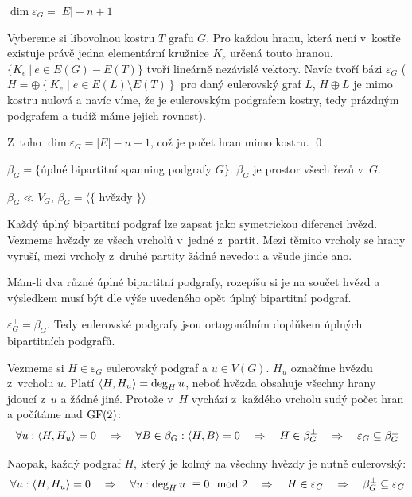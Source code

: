 \lm $\dim \varepsilon_G = |E| - n + 1$

\dk Vybereme si libovolnou kostru $T$ grafu $G$. Pro každou hranu, která není v~kostře
existuje právě jedna elementární kružnice $K_e$ určená touto hranou. $\{ K_e\ |\ e \in
E(G) - E(T) \}$ tvoří lineárně nezávislé vektory. Navíc tvoří bázi $\varepsilon_G$ ($H
= \oplus \left\{ K_e \mid e \in E(L) \setminus E(T) \right\}$ pro daný eulerovský graf
$L$, $H \oplus L$ je mimo kostru nulová a navíc víme, že je eulerovským podgrafem
kostry, tedy prázdným podgrafem a tudíž máme jejich rovnost).

Z~toho $\dim \varepsilon_G = |E| - n + 1$, což je počet hran mimo kostru. \qed

\df $\beta_G = \{$úplné bipartitní spanning podgrafy $G\}$. $\beta_G$ je
prostor všech řezů v~$G$.

\lm $\beta_G \ll V_G$, $\beta_G = \langle\{$ hvězdy $\}\rangle$

\dk Každý úplný bipartitní podgraf lze zapsat jako symetrickou diferenci hvězd.
Vezmeme hvězdy ze všech vrcholů v~jedné z~partit. Mezi těmito vrcholy se hrany
vyruší, mezi vrcholy z~druhé partity žádné nevedou a všude jinde ano. 

Mám-li dva různé úplné bipartitní podgrafy, rozepíšu si je na součet hvězd a
výsledkem musí být dle výše uvedeného opět úplný bipartitní podgraf.

\vt $\varepsilon_G^\bot = \beta_G$. Tedy eulerovské podgrafy jsou ortogonálním
doplňkem úplných bipartitních podgrafů.

\dk Vezmeme si $H \in \varepsilon_G$ eulerovský podgraf a $u \in V(G)$. $H_u$
označíme hvězdu z~vrcholu $u$. Platí ${\langle H,H_u\rangle} = \deg_H u$, neboť hvězda
obsahuje všechny hrany jdoucí z~$u$ a žádné jiné. Protože v~$H$ vychází
z~každého vrcholu sudý počet hran a počítáme nad $\mathrm{GF}(2)$:
\begin{align*}
\forall u: {\langle H,H_u\rangle} = 0 \quad\Rightarrow\quad \forall B\in \beta_G: {\langle H,B\rangle} = 0 \quad\Rightarrow\quad H \in \beta_G^\bot \quad\Rightarrow\quad \varepsilon_G \subseteq \beta_G^\bot
\end{align*}

Naopak, každý podgraf $H$, který je kolmý na všechny hvězdy je nutně eulerovský:
\begin{align*}
\forall u: {\langle H,H_u\rangle} = 0 \quad\Rightarrow\quad \forall u: \deg_H u~\equiv 0 \mod 2 \quad\Rightarrow\quad H \in \varepsilon_G \quad\Rightarrow\quad \beta_G^\bot \subseteq \varepsilon_G
\end{align*}

